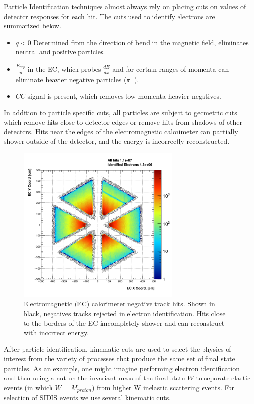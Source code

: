 Particle Identification techniques almost always rely on placing cuts on values of detector responses for each hit.  The cuts used to identify electrons are summarized below.

\begin{itemize}
\item $q < 0$ Determined from the direction of bend in the magnetic field, eliminates neutral and positive particles.
\item $\frac{E_{dep}}{p}$ in the EC, which probes $\frac{dE}{dx}$ and for certain ranges of momenta can eliminate heavier negative particles ($\pi^-$).
\item $CC$ signal is present, which removes low momenta heavier negatives.
\end{itemize}

In addition to particle specific cuts, all particles are subject to geometric cuts which remove hits close to detector edges or remove hits from shadows of other detectors.  Hits near the edges of the electromagnetic calorimeter can partially shower outside of the detector, and the energy is incorrectly reconstructed.  

\begin{figure}
  \centering
  \includegraphics[width=8cm]{image/ECFiducial.png}
  \caption{Electromagnetic (EC) calorimeter negative track hits.  Shown in black, negatives tracks rejected in electron identification.  Hits close to the borders of the EC imcompletely shower and can reconstruct with incorrect energy.}
  \label{fig:ecfid}
\end{figure}

After particle identification, kinematic cuts are used to select the physics of interest from the variety of processes that produce the same set of final state particles.  As an example, one might imagine performing electron identification and then using a cut on the invariant mass of the final state $W$ to separate elastic events (in which $W = M_{proton}$) from higher W inelastic scattering events.  For selection of SIDIS events we use several kinematic cuts.

